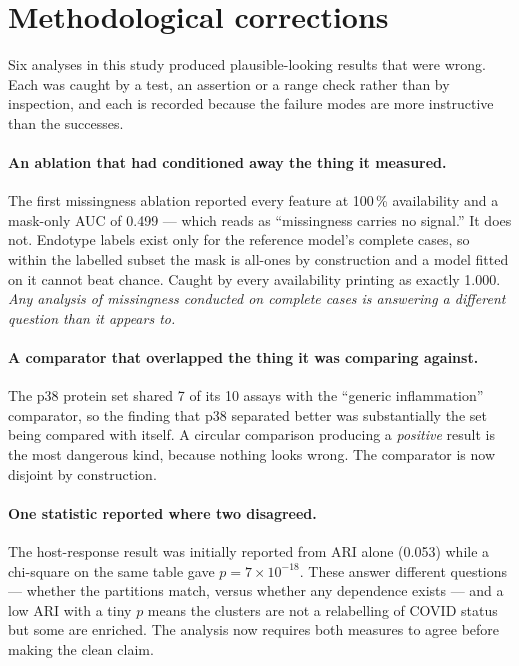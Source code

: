 \documentclass[11pt,letterpaper]{article}
\begin{document}
\section{Methodological corrections}
\label{sec:corrections}

Six analyses in this study produced plausible-looking results that were wrong. Each was
caught by a test, an assertion or a range check rather than by inspection, and each is
recorded because the failure modes are more instructive than the successes.

\paragraph{An ablation that had conditioned away the thing it measured.}
The first missingness ablation reported every feature at 100\,\% availability and a
mask-only AUC of 0.499 --- which reads as ``missingness carries no signal.'' It does not.
Endotype labels exist only for the reference model's complete cases, so within the labelled
subset the mask is all-ones by construction and a model fitted on it cannot beat chance.
Caught by every availability printing as exactly 1.000. \emph{Any analysis of missingness
conducted on complete cases is answering a different question than it appears to.}

\paragraph{A comparator that overlapped the thing it was comparing against.}
The p38 protein set shared 7 of its 10 assays with the ``generic inflammation'' comparator,
so the finding that p38 separated better was substantially the set being compared with
itself. A circular comparison producing a \emph{positive} result is the most dangerous kind,
because nothing looks wrong. The comparator is now disjoint by construction.

\paragraph{One statistic reported where two disagreed.}
The host-response result was initially reported from ARI alone (0.053) while a chi-square on
the same table gave $p = 7 \times 10^{-18}$. These answer different questions --- whether
the partitions match, versus whether any dependence exists --- and a low ARI with a tiny $p$
means the clusters are not a relabelling of COVID status but some are enriched. The analysis
now requires both measures to agree before making the clean claim.
\end{document}
